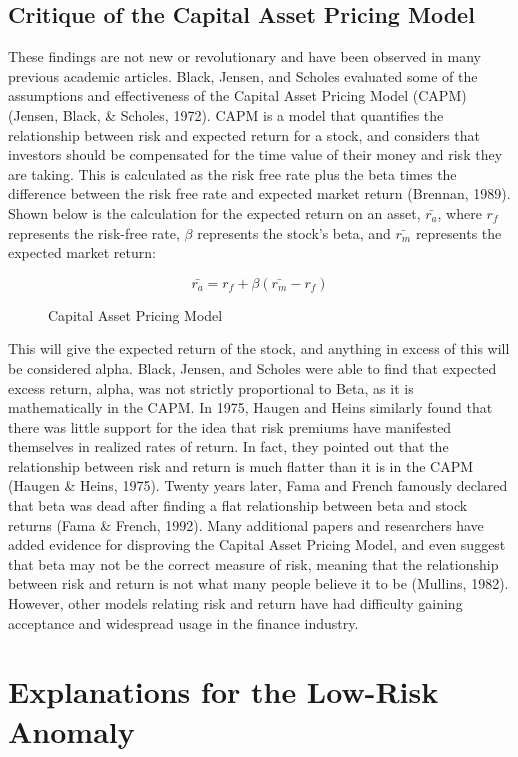 \documentclass[12pt,twoside]{reedthesis}
\theoremstyle{definition}
\theoremstyle{definition}
\theoremstyle{definition}
\theoremstyle{remark}
\begin{document}
\subsection{Critique of the Capital Asset Pricing
Model}\label{critique-of-the-capital-asset-pricing-model}

These findings are not new or revolutionary and have been observed in
many previous academic articles. Black, Jensen, and Scholes evaluated
some of the assumptions and effectiveness of the Capital Asset Pricing
Model (CAPM) (Jensen, Black, \& Scholes, 1972). CAPM is a model that
quantifies the relationship between risk and expected return for a
stock, and considers that investors should be compensated for the time
value of their money and risk they are taking. This is calculated as the
risk free rate plus the beta times the difference between the risk free
rate and expected market return (Brennan, 1989). Shown below is the
calculation for the expected return on an asset, \(\bar{r_a}\), where
\(r_f\) represents the risk-free rate, \(\beta\) represents the stock's
beta, and \(\bar{r_m}\) represents the expected market return:
\begin{figure}
$$ \bar{r_a} = r_f + \beta(\bar{r_m}-r_f)$$
\caption{Capital Asset Pricing Model}
\end{figure}
This will give the expected return of the stock, and anything in excess
of this will be considered alpha. Black, Jensen, and Scholes were able
to find that expected excess return, alpha, was not strictly
proportional to Beta, as it is mathematically in the CAPM. In 1975,
Haugen and Heins similarly found that there was little support for the
idea that risk premiums have manifested themselves in realized rates of
return. In fact, they pointed out that the relationship between risk and
return is much flatter than it is in the CAPM (Haugen \& Heins, 1975).
Twenty years later, Fama and French famously declared that beta was dead
after finding a flat relationship between beta and stock returns (Fama
\& French, 1992). Many additional papers and researchers have added
evidence for disproving the Capital Asset Pricing Model, and even
suggest that beta may not be the correct measure of risk, meaning that
the relationship between risk and return is not what many people believe
it to be (Mullins, 1982). However, other models relating risk and return
have had difficulty gaining acceptance and widespread usage in the
finance industry.

\section{Explanations for the Low-Risk
Anomaly}\label{explanations-for-the-low-risk-anomaly}
\end{document}
